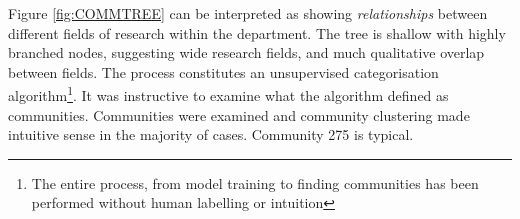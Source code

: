 \newpage

Figure \ref{fig:COMMTREE} can be interpreted as showing \emph{relationships} between different fields of research within the department. The tree is shallow with highly branched nodes, suggesting wide research fields, and much qualitative overlap between fields.
The process constitutes an unsupervised categorisation algorithm\footnote{The entire process, from model training to finding communities has been performed without human labelling or intuition}. It was instructive to examine what the algorithm defined as communities.
Communities were examined and community clustering made intuitive sense in the majority of cases. Community 275 is typical.

